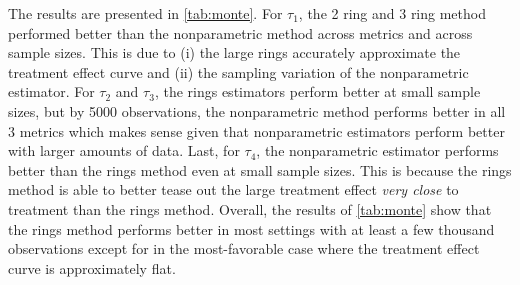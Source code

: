 \documentclass[12pt]{article}
\begin{document}
The results are presented in \autoref{tab:monte}. For $\tau_1$, the 2 ring and 3 ring method performed better than the nonparametric method across metrics and across sample sizes. This is due to (i) the large rings accurately approximate the treatment effect curve and (ii) the sampling variation of the nonparametric estimator. For $\tau_2$ and $\tau_3$, the rings estimators perform better at small sample sizes, but by 5000 observations, the nonparametric method performs better in all 3 metrics which makes sense given that nonparametric estimators perform better with larger amounts of data. Last, for $\tau_4$, the nonparametric estimator performs better than the rings method even at small sample sizes. This is because the rings method is able to better tease out the large treatment effect \emph{very close} to treatment than the rings method. Overall, the results of \autoref{tab:monte} show that the rings method performs better in most settings with at least a few thousand observations except for in the most-favorable case where the treatment effect curve is approximately flat.
\end{document}
